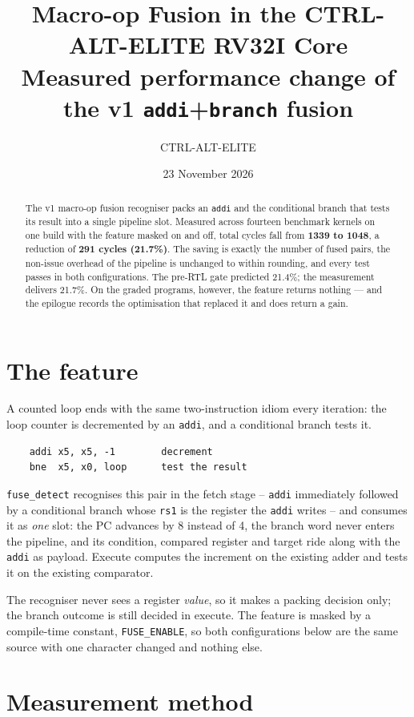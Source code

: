 \documentclass[11pt]{article}
\title{Macro-op Fusion in the CTRL-ALT-ELITE RV32I Core\\\large Measured performance change of the v1 \texttt{addi}+\texttt{branch} fusion}
\author{CTRL-ALT-ELITE}
\date{23 November 2026}
\begin{document}
\maketitle
\begin{abstract}
The v1 macro-op fusion recogniser packs an \texttt{addi} and the conditional branch that
tests its result into a single pipeline slot. Measured across fourteen benchmark kernels on
one build with the feature masked on and off, total cycles fall from \textbf{1339 to 1048},
a reduction of \textbf{291 cycles (21.7\%)}. The saving is exactly the number of fused
pairs, the non-issue overhead of the pipeline is unchanged to within rounding, and every
test passes in both configurations. The pre-RTL gate predicted 21.4\%; the measurement
delivers 21.7\%. On the graded programs, however, the feature returns nothing --- and the
epilogue records the optimisation that replaced it and does return a gain.
\end{abstract}

\section{The feature}

A counted loop ends with the same two-instruction idiom every iteration: the loop counter is
decremented by an \texttt{addi}, and a conditional branch tests it.

\begin{verbatim}
    addi x5, x5, -1        decrement
    bne  x5, x0, loop      test the result
\end{verbatim}

\texttt{fuse\_detect} recognises this pair in the fetch stage -- \texttt{addi} immediately
followed by a conditional branch whose \texttt{rs1} is the register the \texttt{addi}
writes -- and consumes it as \emph{one} slot: the PC advances by 8 instead of 4, the branch
word never enters the pipeline, and its condition, compared register and target ride along
with the \texttt{addi} as payload. Execute computes the increment on the existing adder and
tests it on the existing comparator.

The recogniser never sees a register \emph{value}, so it makes a packing decision only; the
branch outcome is still decided in execute. The feature is masked by a compile-time constant,
\texttt{FUSE\_ENABLE}, so both configurations below are the same source with one character
changed and nothing else.

\section{Measurement method}
\end{document}
